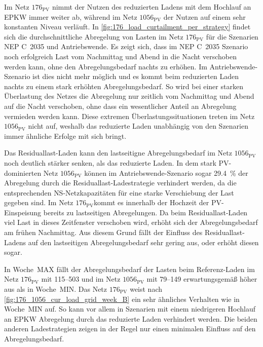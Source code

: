 

Im Netz \(176_{\text{PV}}\) nimmt der Nutzen des reduzierten Ladens mit dem Hochlauf an \gls{EPKW} immer weiter ab, während im Netz \(1056_{\text{PV}}\) der Nutzen auf einem sehr konstanten Niveau verläuft.
In \autoref{fig:176_load_curtailment_per_strategy} findet sich die durchschnittliche Abregelung von Lasten im Netz \(176_{\text{PV}}\) für die Szenarien NEP C~\num{2035} und Antriebswende.
Es zeigt sich, dass im NEP C~\num{2035} Szenario noch erfolgreich Last vom Nachmittag und Abend in die Nacht verschoben werden kann, ohne den Abregelungsbedarf nachts zu erhöhen.
Im Antriebswende-Szenario ist dies nicht mehr möglich und es kommt beim reduzierten Laden nachts zu einem stark erhöhten Abregelungsbedarf.
So wird bei einer starken Überlastung des Netzes die Abregelung nur zeitlich vom Nachmittag und Abend auf die Nacht verschoben, ohne dass ein wesentlicher Anteil an Abregelung vermieden werden kann.
Diese extremen Überlastungssituationen treten im Netz \(1056_{\text{PV}}\) nicht auf, weshalb das reduzierte Laden unabhängig von den Szenarien immer ähnliche Erfolge mit sich bringt.



Das Residuallast-Laden kann den lastseitigne Abregelungsbedarf im Netz \(1056_{\text{PV}}\) noch deutlich stärker senken, als das reduzierte Laden.
In dem stark \gls{PV}-dominierten Netz \(1056_{\text{PV}}\) können im Antriebswende-Szenario sogar \SI{29.4}{\percent} der Abregelung durch die Residuallast-Ladestrategie verhindert werden, da die entsprechenden \gls{NS}-Netzkapazitäten für eine starke Verschiebung der Last gegeben sind.
Im Netz \(176_{\text{PV}}\)kommt es innerhalb der Hochzeit der \gls{PV}-Einspeisung bereits zu lastseitigen Abregelungen.
Da beim Residuallast-Laden viel Last in dieses Zeitfenster verschoben wird, erhöht sich der Abregelungsbedarf am frühen Nachmittag.
Aus diesem Grund fällt der Einfluss des Residuallast-Ladens auf den lastseitigen Abregelungsbedarf sehr gering aus, oder erhöht diesen sogar.\medskip

In Woche~MAX fällt der Abregelungsbedarf der Lasten beim Referenz-Laden im Netz \(176_{\text{PV}}\) mit \SIrange{115}{503}{\mwh} und im Netz \(1056_{\text{PV}}\) mit \SIrange{79}{149}{\mwh} erwartungsgemäß höher aus als in Woche~MIN.
Das Netz \(176_{\text{PV}}\) weist nach \autoref{fig:176_1056_cur_load_grid_week_B} ein sehr ähnliches Verhalten wie in Woche~MIN auf.
So kann vor allem in Szenarien mit einem niedrigeren Hochlauf an \gls{EPKW} Abregelung durch das reduzierte Laden verhindert werden.
Die beiden anderen Ladestrategien zeigen in der Regel nur einen minimalen Einfluss auf den Abregelungsbedarf.\medskip

